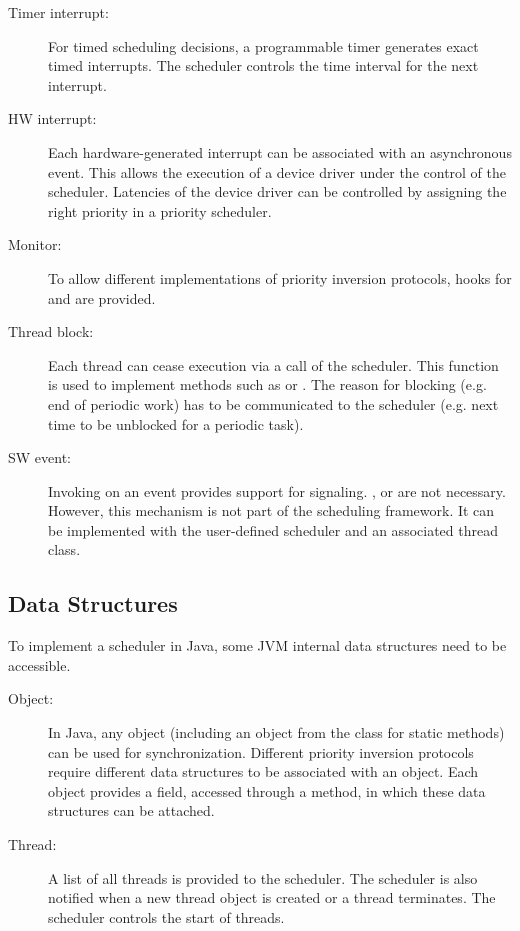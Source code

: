 \begin{description}

\item[Timer interrupt:] For timed scheduling decisions, a programmable
timer generates exact timed interrupts. The scheduler controls the
time interval for the next interrupt.

\item[HW interrupt:] Each hardware-generated interrupt can be associated
with an asynchronous event. This allows the execution of a device
driver under the control of the scheduler. Latencies of the device
driver can be controlled by assigning the right priority in a
priority scheduler.

\item[Monitor:] To allow different implementations of priority inversion
protocols, hooks for  and  are
provided.

\item[Thread block:] Each thread can cease execution via a call of the
scheduler. This function is used to implement methods such as
 or . The reason for
blocking (e.g. end of periodic work) has to be communicated to the
scheduler (e.g. next time to be unblocked for a periodic task).

\item[SW event:] Invoking  on an event provides support for
signaling. ,  or  are
not necessary. However, this mechanism is not part of the scheduling
framework. It can be implemented with the user-defined scheduler and
an associated thread class.

\end{description}

\subsection{Data Structures}

To implement a scheduler in Java, some JVM internal data structures
need to be accessible.

\begin{description}

\item[Object:] In Java, any object (including an object from the class
 for static methods) can be used for synchronization.
Different priority inversion protocols require different data
structures to be associated with an object. Each object provides a
field, accessed through a  method, in which these
data structures can be attached.

\item[Thread:] A list of all threads is provided to the scheduler. The
scheduler is also notified when a new thread object is created or a
thread terminates. The scheduler controls the start of threads.

\end{description}


